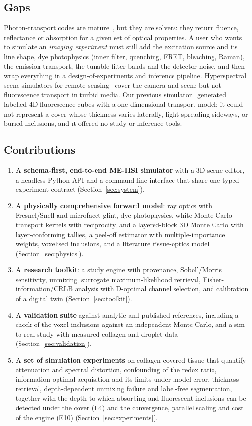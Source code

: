 \documentclass[journal]{IEEEtran}
\begin{document}
\subsection{Gaps}
Photon-transport codes are mature~\cite{wang1995mcml,fang2009mcx,shen2010timos,leino2019valomc}, but they are solvers: they return fluence, reflectance or absorption for a given set of optical properties. A user who wants to simulate an \emph{imaging experiment} must still add the excitation source and its line shape, dye photophysics (inner filter, quenching, FRET, bleaching, Raman), the emission transport, the tunable-filter bands and the detector noise, and then wrap everything in a design-of-experiments and inference pipeline. Hyperspectral scene simulators for remote sensing~\cite{goodenough2017dirsig} cover the camera and scene but not fluorescence transport in turbid media. Our previous simulator~\cite{meloyan2026spectraforge} generated labelled 4D fluorescence cubes with a one-dimensional transport model; it could not represent a cover whose thickness varies laterally, light spreading sideways, or buried inclusions, and it offered no study or inference tools.

\subsection{Contributions}
\begin{enumerate}
\item \textbf{A schema-first, end-to-end ME-HSI simulator} with a 3D scene editor, a headless Python API and a command-line interface that share one typed experiment contract (Section~\ref{sec:system}).
\item \textbf{A physically comprehensive forward model}: ray optics with Fresnel/Snell and microfacet glint, dye photophysics, white-Monte-Carlo transport kernels with reciprocity, and a layered-block 3D Monte Carlo with layer-conforming tallies, a peel-off estimator with multiple-importance weights, voxelised inclusions, and a literature tissue-optics model (Section~\ref{sec:physics}).
\item \textbf{A research toolkit}: a study engine with provenance, Sobol'/Morris sensitivity, unmixing, surrogate maximum-likelihood retrieval, Fisher-information/CRLB analysis with D-optimal channel selection, and calibration of a digital twin (Section~\ref{sec:toolkit}).
\item \textbf{A validation suite} against analytic and published references, including a check of the voxel inclusions against an independent Monte Carlo, and a sim-to-real study with measured collagen and droplet data (Section~\ref{sec:validation}).
\item \textbf{A set of simulation experiments} on collagen-covered tissue that quantify attenuation and spectral distortion, confounding of the redox ratio, information-optimal acquisition and its limits under model error, thickness retrieval, depth-dependent unmixing failure and label-free segmentation, together with the depth to which absorbing and fluorescent inclusions can be detected under the cover (E4) and the convergence, parallel scaling and cost of the engine (E10) (Section~\ref{sec:experiments}).
\end{enumerate}
\end{document}
